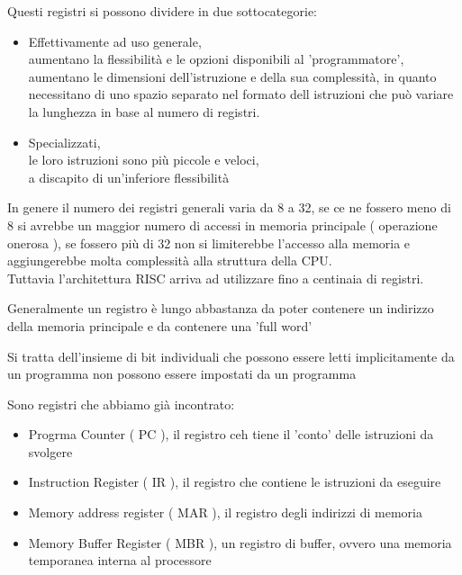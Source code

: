 \documentclass[arch.tex]{subfiles}
\begin{document}
Questi registri si possono dividere in due sottocategorie:

\begin{itemize}
	\item Effettivamente ad uso generale,\\
		aumentano la flessibilità e le opzioni disponibili al 'programmatore',\\
		aumentano le dimensioni dell'istruzione e della sua complessità, in quanto necessitano
		di uno spazio separato nel formato dell istruzioni che può variare la lunghezza 
		in base al numero di registri.
	\item Specializzati,\\
		le loro istruzioni sono più piccole e veloci,\\
		a discapito di un'inferiore flessibilità
\end{itemize}
In genere il numero dei registri generali varia da 8 a 32, se ce ne fossero meno di 8 si avrebbe un maggior
numero di accessi in memoria principale ( operazione onerosa ), se fossero più di 32 non si limiterebbe
l'accesso alla memoria e aggiungerebbe molta complessità alla struttura della CPU.\\
Tuttavia l'architettura RISC arriva ad utilizzare fino a centinaia di registri.

Generalmente un registro è lungo abbastanza da poter contenere un indirizzo della memoria principale e 
da contenere una 'full word'

Si tratta dell'insieme di bit individuali che possono essere letti implicitamente da un programma
non possono essere impostati da un programma

Sono registri che abbiamo già incontrato:

\begin{itemize}
	\item Progrma Counter ( PC ), il registro ceh tiene il 'conto' delle istruzioni da svolgere
	\item Instruction Register ( IR ), il registro che contiene le istruzioni da eseguire
	\item Memory address register ( MAR ), il registro degli indirizzi di memoria
	\item Memory Buffer Register ( MBR ), un registro di buffer, ovvero una memoria temporanea interna al
		processore
\end{itemize}
\end{document}

